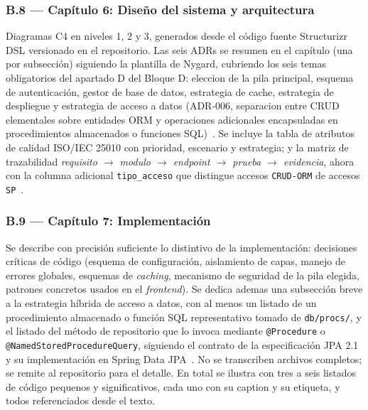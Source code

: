 \documentclass[11pt,a4paper]{article}
\begin{document}
\subsubsection*{B.8 --- Cap\'{i}tulo 6: Dise\~{n}o del sistema y arquitectura}

Diagramas C4 en niveles 1, 2 y 3, generados desde el c\'{o}digo fuente Structurizr DSL versionado en el repositorio. Las seis ADRs se resumen en el cap\'{i}tulo (una por subsecci\'{o}n) siguiendo la plantilla de Nygard, cubriendo los seis temas obligatorios del apartado D del Bloque D: eleccion de la pila principal, esquema de autenticaci\'{o}n, gestor de base de datos, estrategia de cache, estrategia de despliegue y estrategia de acceso a datos (ADR-006, separacion entre CRUD elementales sobre entidades ORM y operaciones adicionales encapsuladas en procedimientos almacenados o funciones SQL)~\cite{nygard2011adr,brown2023c4,demichiel2013jpa21}. Se incluye la tabla de atributos de calidad ISO/IEC 25010 con prioridad, escenario y estrategia; y la matriz de trazabilidad \emph{requisito $\rightarrow$ modulo $\rightarrow$ endpoint $\rightarrow$ prueba $\rightarrow$ evidencia}, ahora con la columna adicional \texttt{tipo\_acceso} que distingue accesos \texttt{CRUD-ORM} de accesos \texttt{SP}~\cite{iso25010}.

\subsubsection*{B.9 --- Cap\'{i}tulo 7: Implementaci\'{o}n}

Se describe con precisi\'{o}n suficiente lo distintivo de la implementaci\'{o}n: decisiones cr\'{i}ticas de c\'{o}digo (esquema de configuraci\'{o}n, aislamiento de capas, manejo de errores globales, esquemas de \emph{caching}, mecanismo de seguridad de la pila elegida, patrones concretos usados en el \emph{frontend}). Se dedica ademas una subsecci\'{o}n breve a la estrategia h\'{i}brida de acceso a datos, con al menos un listado de un procedimiento almacenado o funci\'{o}n SQL representativo tomado de \texttt{db/procs/}, y el listado del m\'{e}todo de repositorio que lo invoca mediante \texttt{@Procedure} o \texttt{@NamedStoredProcedureQuery}, siguiendo el contrato de la especificaci\'{o}n JPA 2.1 y su implementaci\'{o}n en Spring Data JPA~\cite{demichiel2013jpa21,springdata2025procedures}. No se transcriben archivos completos; se remite al repositorio para el detalle. En total se ilustra con tres a seis listados de c\'{o}digo pequenos y significativos, cada uno con su caption y su etiqueta, y todos referenciados desde el texto.
\end{document}
